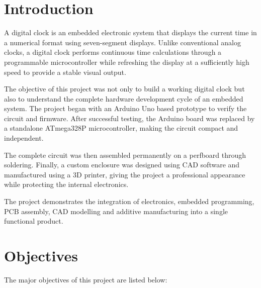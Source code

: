 \documentclass[12pt,a4paper]{article}
\begin{document}
\newpage


\section{Introduction}

A digital clock is an embedded electronic system that displays the current time in a numerical format using seven-segment displays. Unlike conventional analog clocks, a digital clock performs continuous time calculations through a programmable microcontroller while refreshing the display at a sufficiently high speed to provide a stable visual output.

The objective of this project was not only to build a working digital clock but also to understand the complete hardware development cycle of an embedded system. The project began with an Arduino Uno based prototype to verify the circuit and firmware. After successful testing, the Arduino board was replaced by a standalone ATmega328P microcontroller, making the circuit compact and independent.

The complete circuit was then assembled permanently on a perfboard through soldering. Finally, a custom enclosure was designed using CAD software and manufactured using a 3D printer, giving the project a professional appearance while protecting the internal electronics.

The project demonstrates the integration of electronics, embedded programming, PCB assembly, CAD modelling and additive manufacturing into a single functional product.


\section{Objectives}

The major objectives of this project are listed below:
\end{document}
